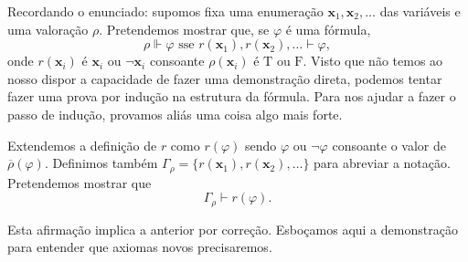 \documentclass{report}
\theoremstyle{definition}
\theoremstyle{remark}
\renewcommand{\bf}[1]{\mathbf{#1}}
\newcommand{\lt}{\mathrm{T}}
\newcommand{\lf}{\mathrm{F}}
\begin{document}
	Recordando o enunciado: supomos fixa uma enumeração $\bf x_1, \bf x_2, \dots$ das variáveis e uma valoração $\rho$. Pretendemos mostrar que, se $\varphi$ é uma fórmula,
	\[\rho \Vdash \varphi \text{ sse } r(\bf x_1), r(\bf x_2), \dots \vdash \varphi,\]
	onde $r(\bf x_i)$ é $\bf x_i$ ou $\neg \bf x_i$ consoante $\rho(\bf x_i)$ é $\lt$ ou $\lf$. Visto que não temos ao nosso dispor a capacidade de fazer uma demonstração direta, podemos tentar fazer uma prova por indução na estrutura da fórmula. Para nos ajudar a fazer o passo de indução, provamos aliás uma coisa algo mais forte.
	
	Extendemos a definição de $r$ como $r(\varphi)$ sendo $\varphi$ ou $\neg \varphi$ consoante o valor de $\overline\rho(\varphi)$. Definimos também $\Gamma_\rho = \{r(\bf x_1), r(\bf x_2), \dots\}$ para abreviar a notação. Pretendemos mostrar que
	\[\Gamma_\rho \vdash r(\varphi).\]
	
	Esta afirmação implica a anterior por correção. Esboçamos aqui a demonstração para entender que axiomas novos precisaremos.
	
\end{document}
